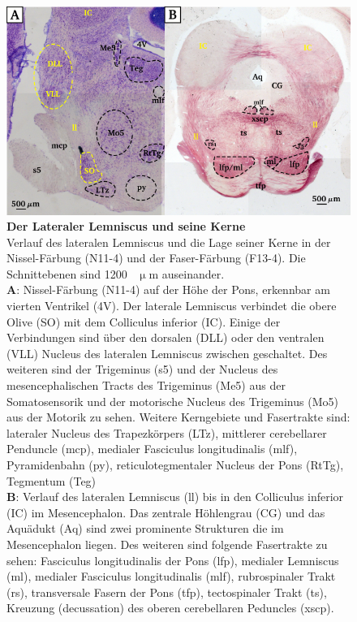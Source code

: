 \documentclass[12pt,a4paper,pdftex]{article}
\begin{document}
\begin{figure}[H]
    \centering
    \includegraphics[width = \textwidth]{pictures/auditory/lateral_lemniscus.png}
    \caption[Der Lateraler Lemniscus und seine Kerne]{\textbf{Der Lateraler Lemniscus und seine Kerne}\\ 
    Verlauf des lateralen Lemniscus und die Lage seiner Kerne in der Nissel-Färbung (N11-4) und der Faser-Färbung (F13-4). Die Schnittebenen sind 1200~ $\upmu$m auseinander.\\
    \textbf{A}: Nissel-Färbung (N11-4) auf der Höhe der Pons, erkennbar am vierten Ventrikel (4V).
    Der laterale Lemniscus verbindet die obere Olive (SO) mit dem Colliculus inferior (IC). Einige der Verbindungen sind über den dorsalen (DLL) oder den ventralen (VLL) Nucleus des lateralen Lemniscus zwischen geschaltet. 
    Des weiteren sind der Trigeminus (s5) und der Nucleus des mesencephalischen Tracts des Trigeminus (Me5) aus der Somatosensorik und der motorische Nucleus des Trigeminus (Mo5) aus der Motorik zu sehen. 
    Weitere Kerngebiete und Fasertrakte sind: lateraler Nucleus des Trapezkörpers (LTz), mittlerer cerebellarer Penduncle (mcp), medialer Fasciculus longitudinalis (mlf), Pyramidenbahn (py), reticulotegmentaler Nucleus der Pons (RtTg), Tegmentum (Teg)\\
    \textbf{B}: Verlauf des lateralen Lemniscus (ll) bis in den Colliculus inferior (IC) im Mesencephalon. Das zentrale Höhlengrau (CG) und das Aquädukt (Aq) sind zwei prominente Strukturen die im Mesencephalon liegen. Des weiteren sind folgende Fasertrakte zu sehen: Fasciculus longitudinalis der Pons (lfp), medialer Lemniscus (ml), medialer Fasciculus longitudinalis (mlf), rubrospinaler Trakt (rs), transversale Fasern der Pons (tfp), tectospinaler Trakt (ts), Kreuzung (decussation) des oberen cerebellaren Peduncles (xscp).}
    \label{fig:lateraler_lemniscus}
\end{figure}
\end{document}
